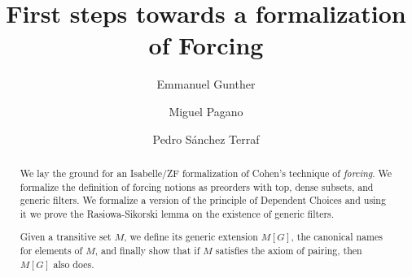 \documentclass{article}
\begin{document}
\title{First steps towards a formalization of Forcing}
\author{Emmanuel Gunther
  \and 
  Miguel Pagano
  \and 
  Pedro S\'anchez Terraf}
\maketitle

\begin{abstract} 
  We lay the ground for an Isabelle/ZF formalization of Cohen's technique of
  \emph{forcing}. We formalize the definition of forcing notions as
  preorders with top, dense subsets, and generic filters. We formalize
  a version of the principle of Dependent Choices and using it
  we prove the Rasiowa-Sikorski lemma on the existence of generic filters.
  
  Given a transitive set $M$, we define its generic extension $M[G]$,
  the canonical names for elements of $M$, and finally show that if $M$
  satisfies the axiom of pairing, then $M[G]$ also does.
\end{abstract}






















%
\end{document}
